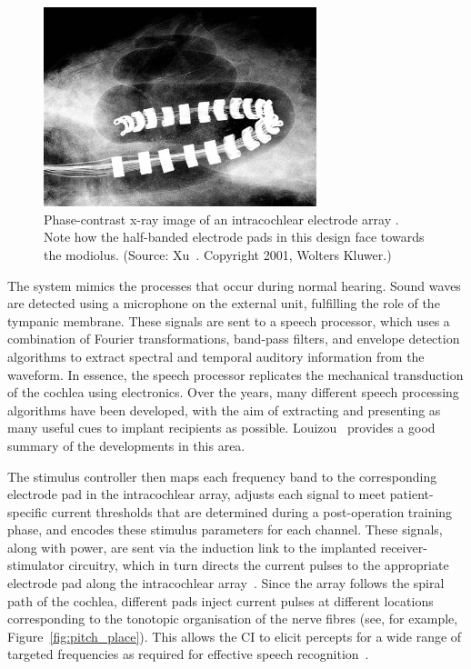 \begin{figure}
	\centering
	\includegraphics[height=5.8cm]{Background/CI_phase-contrast_x-ray}
	\caption[Phase-contrast x-ray image of an intracochlear electrode array
	\insitu]{Phase-contrast x-ray image of an intracochlear electrode array
	\insitu. Note how the half-banded electrode pads in this design face towards
	the modiolus. (Source: Xu~\cite{xu2001}. Copyright \textcopyright{} 2001,
	Wolters Kluwer.)}
	\label{fig:CI_in_situ}
\end{figure} 

The system mimics the processes that occur during normal hearing. Sound waves
are detected using a microphone on the external unit, fulfilling the role of the
tympanic membrane. These signals are sent to a speech processor, which uses a
combination of Fourier transformations, band-pass filters, and envelope
detection algorithms to extract spectral and temporal auditory information from
the waveform. In essence, the speech processor replicates the mechanical
transduction of the cochlea using electronics. Over the years, many different
speech processing algorithms have been developed, with the aim of extracting and
presenting as many useful cues to implant recipients as possible.
Louizou~\cite{loizou1998} provides a good summary of the developments in this
area.

The stimulus controller then maps each frequency band to the corresponding
electrode pad in the intracochlear array, adjusts each signal to meet
patient-specific current thresholds that are determined during a post-operation
training phase, and encodes these stimulus parameters for each channel. These
signals, along with power, are sent via the induction link to the implanted
receiver-stimulator circuitry, which in turn directs the current pulses to the
appropriate electrode pad along the intracochlear
array~\cite{webster1998,clark1996}. Since the array follows the spiral path of
the cochlea, different pads inject current pulses at different locations
corresponding to the tonotopic organisation of the nerve fibres (see, for
example, Figure~\ref{fig:pitch_place}). This allows the CI to elicit percepts
for a wide range of targeted frequencies as required for effective speech
recognition~\cite{eddington1977,busby1994,clark2013}.

